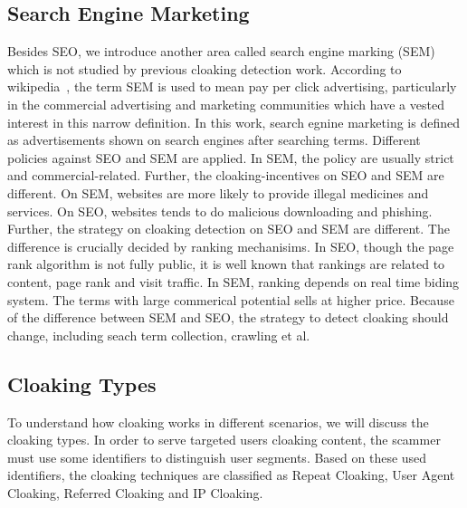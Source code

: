 \subsection{Search Engine Marketing}
Besides SEO, we introduce another area called search engine marking (SEM) which
is not studied by previous cloaking detection work. According to wikipedia~\cite{sem-wiki}, the term SEM is used to mean pay per click advertising,
particularly in the commercial advertising and marketing communities which have a vested interest in this narrow definition. 
In this work, search egnine marketing is defined as advertisements shown on
search engines after searching terms. Different policies against SEO and SEM are
applied. In SEM, the policy are usually strict and commercial-related. 
Further, the cloaking-incentives on SEO and SEM are different. On SEM, websites are more likely to provide illegal medicines and services. On SEO,
websites tends to do malicious downloading and phishing. 
Further, the strategy on cloaking detection on SEO and SEM are different. 
The difference is crucially decided by ranking mechanisims.
In SEO, though the page rank algorithm is not fully public, it is well known that rankings are related to content, page rank and visit traffic.
In SEM, ranking depends on real time biding system. The terms with large
commerical potential sells at higher price. Because of the 
difference between SEM and SEO, the strategy to detect cloaking should change,
including seach term collection, crawling et al.
\subsection{Cloaking Types}
To understand how cloaking works in different scenarios, we will discuss the cloaking types.
In order to serve targeted users cloaking content, the scammer must use some identifiers to distinguish 
user segments. Based on these used identifiers, the cloaking techniques are classified as Repeat Cloaking, 
User Agent Cloaking, Referred Cloaking and IP Cloaking. 

